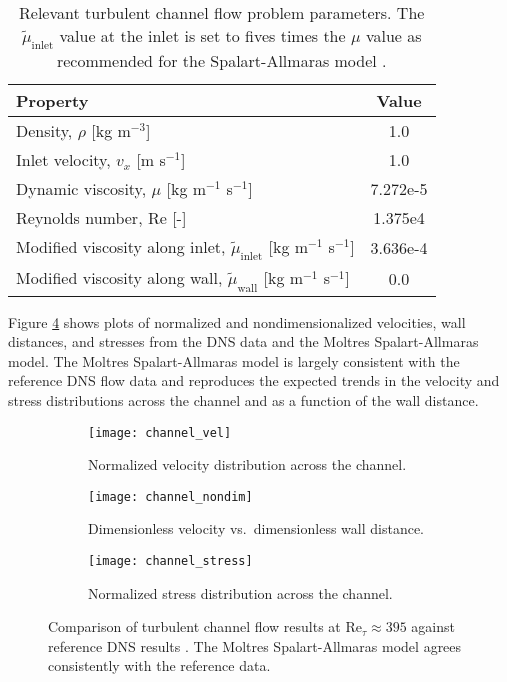 \begin{table}[htb]
  \centering
  \small
  \caption{Relevant turbulent channel flow problem parameters. The $\tilde{\mu}_\text{inlet}$ value
  at the inlet is set to fives times the $\mu$ value as recommended for the Spalart-Allmaras model
  \cite{spalart_one-equation_1994}.}
  \begin{tabular}{l S}
    \toprule
    Property & {Value} \\
    \midrule
    Density, $\rho$ [kg m$^{-3}$] & 1.0 \\
    Inlet velocity, $v_x$ [m s$^{-1}$] & 1.0 \\
    Dynamic viscosity, $\mu$ [kg m$^{-1}$ s$^{-1}$] & 7.272e-5 \\
    Reynolds number, Re [-] & 1.375e4 \\
    Modified viscosity along inlet, $\tilde{\mu}_\text{inlet}$ [kg m$^{-1}$ s$^{-1}$] & 3.636e-4 \\
    Modified viscosity along wall, $\tilde{\mu}_\text{wall}$ [kg m$^{-1}$ s$^{-1}$] & 0.0 \\
    \bottomrule
  \end{tabular}
  \label{table:channel}
\end{table}

Figure \ref{fig:channel-verification} shows plots of normalized and nondimensionalized velocities,
wall distances, and stresses from the \gls{DNS} data \cite{moser_direct_1999}
and the Moltres Spalart-Allmaras model. The Moltres Spalart-Allmaras model is largely consistent with the reference
\gls{DNS} flow data and reproduces the expected trends in the velocity and stress distributions
across the channel and as a function of the wall distance.

\begin{figure}[htb!]
  \centering
  \begin{subfigure}[b]{0.48\columnwidth}
    \centering
    \texttt{[image: channel\_vel]}
    \caption{Normalized velocity distribution across the channel.}
    \label{fig:channel-vel}
  \end{subfigure}
  \hfill
  \begin{subfigure}[b]{0.48\columnwidth}
    \centering
    \texttt{[image: channel\_nondim]}
    \caption{Dimensionless velocity vs.\ dimensionless wall distance.}
    \label{fig:channel-nondim}
  \end{subfigure}
  \begin{subfigure}[b]{0.48\columnwidth}
    \centering
    \texttt{[image: channel\_stress]}
    \caption{Normalized stress distribution across the channel.}
    \label{fig:channel-stress}
  \end{subfigure}
  \caption{Comparison of turbulent channel flow results at Re$_\tau\approx395$ against reference
  \gls{DNS} results \cite{moser_direct_1999}. The Moltres Spalart-Allmaras model agrees consistently with
  the reference data.}
  \label{fig:channel-verification}
\end{figure}

